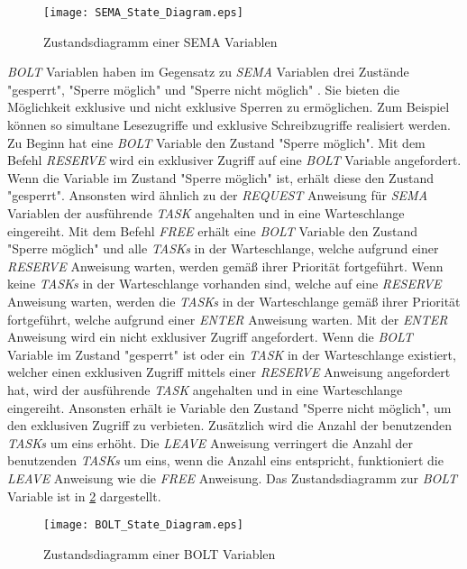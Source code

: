 \begin{figure}[ht]
  \texttt{[image: SEMA\_State\_Diagram.eps]}
  \caption{Zustandsdiagramm einer SEMA Variablen}
  \label{fig:SEMA_StateDiagram}
\end{figure}

\textit{BOLT} Variablen haben im Gegensatz zu \textit{SEMA} Variablen drei
Zustände "gesperrt", "Sperre möglich" und "Sperre nicht möglich"
\autocite[9--17]{PEARL}. Sie bieten die Möglichkeit exklusive und nicht
exklusive Sperren zu ermöglichen. Zum Beispiel können so simultane Lesezugriffe
und exklusive Schreibzugriffe realisiert werden. Zu Beginn hat eine
\textit{BOLT} Variable den Zustand "Sperre möglich". Mit dem Befehl
\textit{RESERVE} wird ein exklusiver Zugriff auf eine \textit{BOLT} Variable
angefordert. Wenn die Variable im Zustand "Sperre möglich" ist, erhält diese den
Zustand "gesperrt". Ansonsten wird ähnlich zu der \textit{REQUEST} Anweisung für
\textit{SEMA} Variablen der ausführende \textit{TASK} angehalten und in eine
Warteschlange eingereiht. Mit dem Befehl \textit{FREE} erhält eine \textit{BOLT}
Variable den Zustand "Sperre möglich" und alle \textit{TASKs} in der
Warteschlange, welche aufgrund einer \textit{RESERVE} Anweisung warten, werden
gemäß ihrer Priorität fortgeführt. Wenn keine \textit{TASKs} in der
Warteschlange vorhanden sind, welche auf eine \textit{RESERVE} Anweisung warten,
werden die \textit{TASKs} in der Warteschlange gemäß ihrer Priorität
fortgeführt, welche aufgrund einer \textit{ENTER} Anweisung warten. Mit der
\textit{ENTER} Anweisung wird ein nicht exklusiver Zugriff angefordert. Wenn die
\textit{BOLT} Variable im Zustand "gesperrt" ist oder ein \textit{TASK} in der
Warteschlange existiert, welcher einen exklusiven Zugriff mittels einer
\textit{RESERVE} Anweisung angefordert hat, wird der ausführende \textit{TASK}
angehalten und in eine Warteschlange eingereiht. Ansonsten erhält ie Variable
den Zustand "Sperre nicht möglich", um den exklusiven Zugriff zu verbieten.
Zusätzlich wird die Anzahl der benutzenden \textit{TASKs} um eins erhöht. Die
\textit{LEAVE} Anweisung verringert die Anzahl der benutzenden \textit{TASKs} um
eins, wenn die Anzahl eins entspricht, funktioniert die \textit{LEAVE} Anweisung
wie die \textit{FREE} Anweisung. Das Zustandsdiagramm zur \textit{BOLT} Variable
ist in \cref{fig:BOLT_StateDiagram} dargestellt.

\begin{figure}[ht]
  \texttt{[image: BOLT\_State\_Diagram.eps]}
  \caption{Zustandsdiagramm einer BOLT Variablen}
  \label{fig:BOLT_StateDiagram}
\end{figure}

